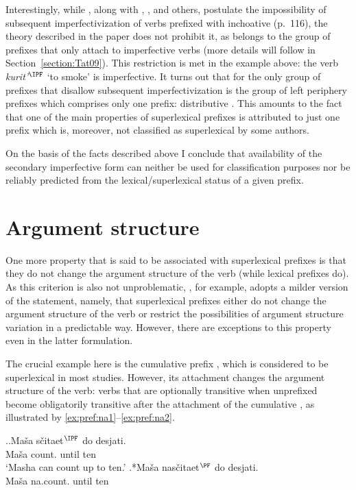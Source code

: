 Interestingly, while \citet{Tatevosov:09}, along with \citet{Svenonius:04b}, \citet{Ramchand:04}, and others, postulate the impossibility of subsequent imperfectivization of verbs prefixed with inchoative  (p.~116), the theory described in the paper does not prohibit it, as  belongs to the group of prefixes that only attach to imperfective verbs (more details will follow in Section~\ref{section:Tat09}). This restriction is met in the example above: the verb \textit{kurit'}$^{\IPF}$ `to smoke' is imperfective. It turns out that for \citet{Tatevosov:09} the only group of prefixes that disallow subsequent imperfectivization is the group of left periphery prefixes which comprises only one prefix: distributive . This amounts to the fact that one of the main properties of superlexical prefixes is attributed to just one prefix which is, moreover, not classified as superlexical by some authors.

On the basis of the facts described above I conclude that availability of the secondary imperfective form can neither be used for classification purposes nor be reliably predicted from the lexical/superlexical status of a given prefix.

\section{Argument structure}\label{section:new:argstructure}
One more property that is said to be associated with superlexical prefixes is that they do not change the argument structure of the verb (while lexical prefixes do). As this criterion is also not unproblematic, \citet[116]{Tatevosov:09}, for example, adopts a milder version of the statement, namely, that superlexical prefixes either do not change the argument structure of the verb or restrict the possibilities of argument structure variation in a predictable way. However, there are exceptions to this property even in the latter formulation. 

The crucial example here is the cumulative prefix , which is considered to be superlexical in most studies. However, its attachment changes the argument structure of the verb: verbs that are optionally transitive when unprefixed become obligatorily transitive after the attachment of the cumulative , as illustrated by \ref{ex:pref:na1}--\ref{ex:pref:na2}.

\ex.\label{ex:pref:na1}\ag.\label{ex:pref:na1a}Ma\v{s}a s\v{c}itaet$^{\IPF}$ do desjati.\\
Ma\v{s}a count. until ten\\
\trans `Masha can count up to ten.'
\bg.*Ma\v{s}a nas\v{c}itaet$^{\PF}$ do desjati.\label{ex:pref:na1b}\\
Ma\v{s}a na.count. until ten\\

